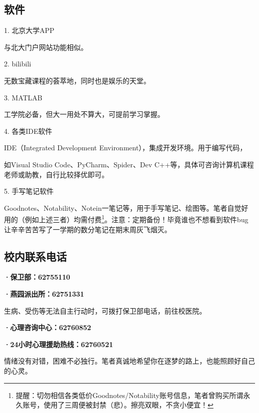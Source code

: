 \documentclass[11pt,oneside]{book}
\begin{document}
\subsection{软件}

1. 北京大学APP

与北大门户网站功能相似。

\vspace{10pt}

2. bilibili

无数宝藏课程的荟萃地，同时也是娱乐的天堂。

\vspace{10pt}

3. MATLAB

工学院必备，但大一用处不算大，可提前学习掌握。

\vspace{10pt}

4. 各类IDE软件

IDE（Integrated Development Environment），集成开发环境。用于编写代码，

如Visual Studio Code、PyCharm、Spider、Dev C++等，具体可咨询计算机课程老师或助教，自行比较择优即可。

\vspace{10pt}

5. 手写笔记软件

Goodnotes、Notability、Notein一笔记等，用于手写笔记、绘图等。笔者自觉好用的（例如上述三者）均需付费\footnote{提醒：切勿相信各类低价Goodnotes/Notability账号信息，笔者曾购买所谓永久账号，使用了三周便被封禁（悲）。擦亮双眼，不贪小便宜！}。注意：定期备份！毕竟谁也不想看到软件bug让辛辛苦苦写了一学期的数分笔记在期末周灰飞烟灭。

\subsection{校内联系电话}

\textbf{·保卫部：62755110}

\textbf{·燕园派出所：62751331}

生病、受伤等无法自主行动时，可拨打保卫部电话，前往校医院。

\vspace{10pt}

\textbf{·心理咨询中心：62760852}

\textbf{·24小时心理援助热线：62760521}

情绪没有对错，困难不必独行。笔者真诚地希望你在逐梦的路上，也能照顾好自己的心灵。

\vspace{10pt}
\end{document}
